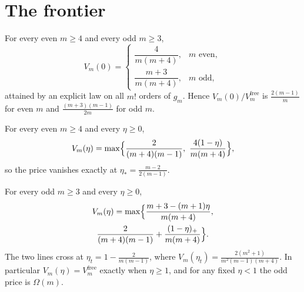 \section{The frontier}
\label{sec:frontier}

\begin{theorem}
\label{thm:zero}
For every even $m\ge4$ and every odd $m\ge3$,
\[
V_{m}(0)=
\begin{cases}
\dfrac{4}{m(m+4)}, & m\text{ even},\\[8pt]
\dfrac{m+3}{m(m+4)}, & m\text{ odd},
\end{cases}
\]
attained by an explicit law on all $m!$ orders of $g_{m}$. Hence
$V_{m}(0)/V^{\mathrm{free}}_{m}$ is $\frac{2(m-1)}{m}$ for even $m$ and
$\frac{(m+3)(m-1)}{2m}$ for odd $m$.
\end{theorem}


\begin{theorem}
\label{thm:even}
For every even $m\ge4$ and every $\eta\ge0$,
\[
V_{m}(\eta)=\max\Bigl\{\frac{2}{(m+4)(m-1)},\ \frac{4(1-\eta)}{m(m+4)}\Bigr\},
\]
so the price vanishes exactly at $\eta_{*}=\frac{m-2}{2(m-1)}$.
\end{theorem}


\begin{theorem}
\label{thm:odd}
For every odd $m\ge3$ and every $\eta\ge0$,
\begin{multline*}
V_{m}(\eta)=\max\Bigl\{\frac{m+3-(m+1)\eta}{m(m+4)},\\
\frac{2}{(m+4)(m-1)}+\frac{(1-\eta)_{+}}{m(m+4)}\Bigr\}.
\end{multline*}
The two lines cross at $\eta_{t}=1-\frac{2}{m(m-1)}$, where
$V_{m}(\eta_{t})=\frac{2(m^{2}+1)}{m^{2}(m-1)(m+4)}$. In particular
$V_{m}(\eta)=V^{\mathrm{free}}_{m}$ exactly when $\eta\ge1$, and for any fixed $\eta<1$ the
odd price is $\Omega(m)$.
\end{theorem}


